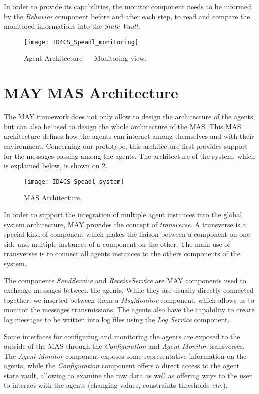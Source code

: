 In order to provide its capabilities, the monitor component needs to be informed by the \emph{Behavior} component before and after each step, to read and compare the monitored informations into the \emph{State Vault}.

\begin{figure}
\centering
\texttt{[image: ID4CS\_Speadl\_monitoring]}
\caption{Agent Architecture --- Monitoring view.}
\label{Arch-monitor}
\end{figure}

\section{MAY MAS Architecture}

The MAY framework does not only allow to design the architecture of the agents, but can also be used to design the whole architecture of the MAS. This MAS architecture defines how the agents can interact among themselves and with their environment. Concerning our prototype, this architecture first provides support for the messages passing among the agents. The architecture of the system, which is explained below, is shown on \figurename{} \ref{Arch-MAS}.

\begin{figure}
\texttt{[image: ID4CS\_Speadl\_system]}
\caption{MAS Architecture.}\label{Arch-MAS}
\end{figure}

In order to support the integration of multiple agent instances into the global system architecture, MAY provides the concept of \emph{transverse}. A transverse is a special kind of component which makes the liaison between a component on one side and multiple instances of a component on the other. The main use of transverses is to connect all agents instances to the others components of the system.

The components \emph{SendService} and \emph{ReceiveService} are MAY components used to exchange messages between the agents. While they are usually directly connected together, we inserted between them a \emph{MsgMonitor} component, which allows us to monitor the messages transmissions. The agents also have the capability to create log messages to be written into log files using the \emph{Log Service} component.

Some interfaces for configuring and monitoring the agents are exposed to the outside of the MAS through the \emph{Configuration} and \emph{Agent Monitor} transverses. The \emph{Agent Monitor} component exposes some representative information on the agents, while the \emph{Configuration} component offers a direct access to the agent state vault, allowing to examine the raw data as well as offering ways to the user to interact with the agents (changing values, constraints thresholds \emph{etc.}).

